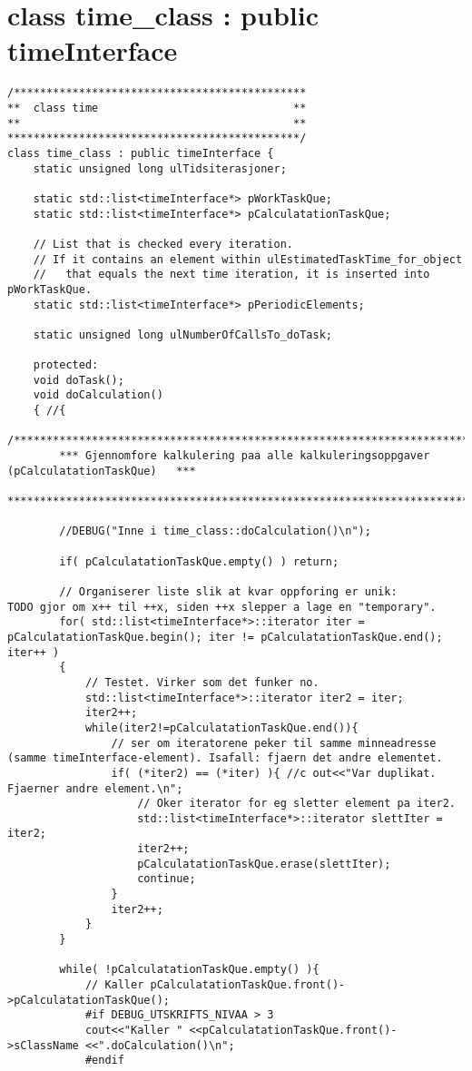 \chapter{class time\_class : public timeInterface} %
\label{appendixTimeClass}
\begin{lstlisting}
/*********************************************
** 	class time  							**
** 		 									**
*********************************************/
class time_class : public timeInterface {
	static unsigned long ulTidsiterasjoner;
	
	static std::list<timeInterface*> pWorkTaskQue;
	static std::list<timeInterface*> pCalculatationTaskQue;

	// List that is checked every iteration.
	// If it contains an element within ulEstimatedTaskTime_for_object
	//   that equals the next time iteration, it is inserted into pWorkTaskQue.
	static std::list<timeInterface*> pPeriodicElements;

	static unsigned long ulNumberOfCallsTo_doTask;

	protected:
	void doTask();
	void doCalculation()
	{ //{
		/**************************************************************************************
		*** Gjennomfore kalkulering paa alle kalkuleringsoppgaver (pCalculatationTaskQue) 	***
		**************************************************************************************/

		//DEBUG("Inne i time_class::doCalculation()\n");

		if( pCalculatationTaskQue.empty() ) return;

		// Organiserer liste slik at kvar oppforing er unik: 			TODO gjor om x++ til ++x, siden ++x slepper a lage en "temporary".
		for( std::list<timeInterface*>::iterator iter = pCalculatationTaskQue.begin(); iter != pCalculatationTaskQue.end(); iter++ )
		{
			// Testet. Virker som det funker no.
			std::list<timeInterface*>::iterator iter2 = iter; 
			iter2++;
			while(iter2!=pCalculatationTaskQue.end()){
				// ser om iteratorene peker til samme minneadresse (samme timeInterface-element). Isafall: fjaern det andre elementet.
			 	if( (*iter2) == (*iter) ){ //c out<<"Var duplikat. Fjaerner andre element.\n";
					// Oker iterator for eg sletter element pa iter2.
					std::list<timeInterface*>::iterator slettIter = iter2;
					iter2++;
					pCalculatationTaskQue.erase(slettIter);
					continue;
				}
				iter2++;
			}
		}
	
		while( !pCalculatationTaskQue.empty() ){
			// Kaller pCalculatationTaskQue.front()->pCalculatationTaskQue();
			#if DEBUG_UTSKRIFTS_NIVAA > 3
			cout<<"Kaller " <<pCalculatationTaskQue.front()->sClassName <<".doCalculation()\n";
			#endif


\end{lstlisting}
